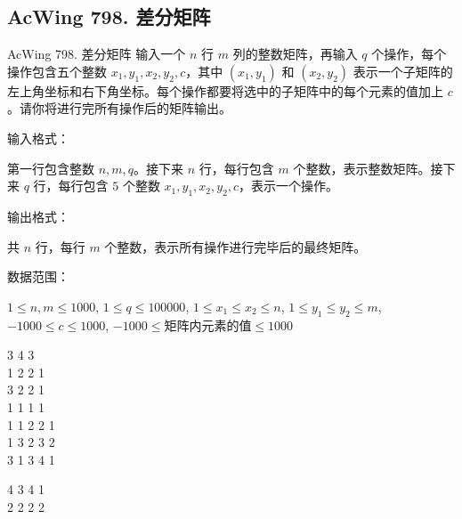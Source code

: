 \subsection{AcWing 798. 差分矩阵}
\begin{titledbox}{AcWing 798. 差分矩阵}
    输入一个 $n$ 行 $m$ 列的整数矩阵，再输入 $q$ 个操作，每个操作包含五个整数 $x_1, y_1, x_2, y_2, c$，其中 $(x_1, y_1)$ 和 $(x_2, y_2)$ 表示一个子矩阵的左上角坐标和右下角坐标。每个操作都要将选中的子矩阵中的每个元素的值加上 $c$。请你将进行完所有操作后的矩阵输出。

    输入格式：

    第一行包含整数 $n,m,q$。接下来 $n$ 行，每行包含 $m$ 个整数，表示整数矩阵。接下来 $q$ 行，每行包含 $5$ 个整数 $x_1, y_1, x_2, y_2, c$，表示一个操作。

    输出格式：

    共 $n$ 行，每行 $m$ 个整数，表示所有操作进行完毕后的最终矩阵。

    数据范围：

    $1 \le n,m \le 1000$, $1 \le q \le 100000$, $1 \le x_1 \le x_2 \le n$, $1 \le y_1 \le y_2 \le m$, $-1000 \le c \le 1000$, $-1000 \le 矩阵内元素的值 \le 1000$

    \begin{inputblock}
        3 4 3 \\
        1 2 2 1 \\
        3 2 2 1 \\
        1 1 1 1 \\
        1 1 2 2 1 \\
        1 3 2 3 2 \\
        3 1 3 4 1
    \end{inputblock}
    \begin{outputblock}
        4 3 4 1 \\
        2 2 2 2
    \end{outputblock}
\end{titledbox}

